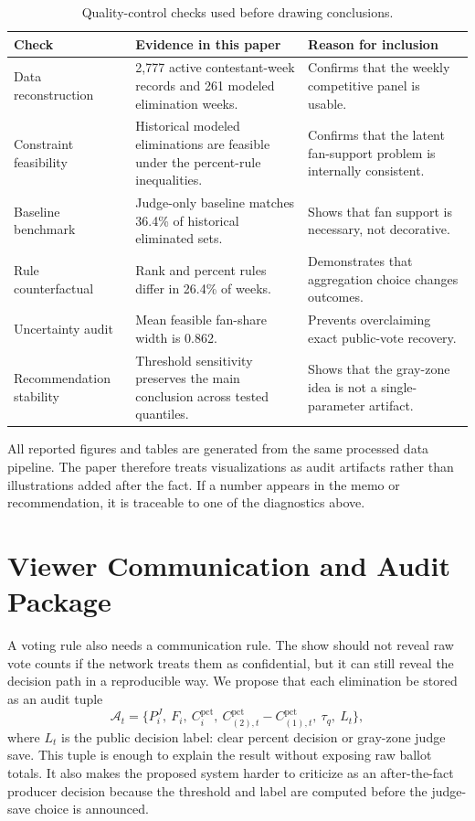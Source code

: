 \documentclass[12pt]{article}
\begin{document}
\begin{table}[!htbp]
  \centering
  \caption{Quality-control checks used before drawing conclusions.}
  \label{tab:quality-control}
  \begin{tabularx}{0.98\linewidth}{lXX}
    \toprule
    Check & Evidence in this paper & Reason for inclusion \\
    \midrule
    Data reconstruction & 2,777 active contestant-week records and 261 modeled
    elimination weeks. & Confirms that the weekly competitive panel is usable. \\
    Constraint feasibility & Historical modeled eliminations are feasible under
    the percent-rule inequalities. & Confirms that the latent fan-support
    problem is internally consistent. \\
    Baseline benchmark & Judge-only baseline matches 36.4\% of historical
    eliminated sets. & Shows that fan support is necessary, not decorative. \\
    Rule counterfactual & Rank and percent rules differ in 26.4\% of weeks. &
    Demonstrates that aggregation choice changes outcomes. \\
    Uncertainty audit & Mean feasible fan-share width is 0.862. & Prevents
    overclaiming exact public-vote recovery. \\
    Recommendation stability & Threshold sensitivity preserves the main
    conclusion across tested quantiles. & Shows that the gray-zone idea is not
    a single-parameter artifact. \\
    \bottomrule
  \end{tabularx}
\end{table}

All reported figures and tables are generated from the same processed data
pipeline. The paper therefore treats visualizations as audit artifacts rather
than illustrations added after the fact. If a number appears in the memo or
recommendation, it is traceable to one of the diagnostics above.

\section{Viewer Communication and Audit Package}

A voting rule also needs a communication rule. The show should not reveal raw
vote counts if the network treats them as confidential, but it can still reveal
the decision path in a reproducible way. We propose that each elimination be
stored as an audit tuple
\[
  \mathcal{A}_t=\{P_i^J,\ F_i,\ C_i^{\mathrm{pct}},\
  C^{\mathrm{pct}}_{(2),t}-C^{\mathrm{pct}}_{(1),t},\ \tau_q,\ L_t\},
\]
where $L_t$ is the public decision label: clear percent decision or gray-zone
judge save. This tuple is enough to explain the result without exposing raw
ballot totals. It also makes the proposed system harder to criticize as an
after-the-fact producer decision because the threshold and label are computed
before the judge-save choice is announced.
\end{document}
